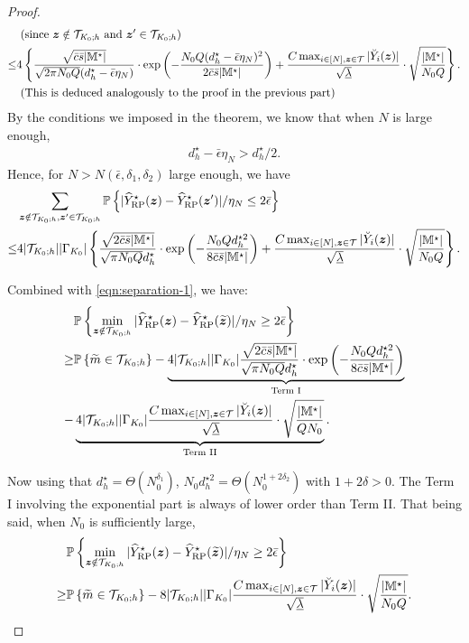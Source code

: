 \documentclass[12pt]{article}
\begin{document}
\begin{proof}
\begin{align*}
    & \text{ (since ${\boldsymbol{z}}\notin{\mathcal{T}}_{K_0;h}$ and ${\boldsymbol{z}}'\in{\mathcal{T}}_{K_0;h}$)}\\
    \le & 4\left\{ \frac{\sqrt{\bar{c}\bar{s}|{\mathbb{M}}^\star|}}{\sqrt{2\pi N_0Q }({d_h^\star - \bar{\epsilon}\eta_N})}\cdot \exp\left(-\frac{ N_0Q ({d_h^\star - \bar{\epsilon}\eta_N})^{  2}}{2\bar{c}\bar{s}|{\mathbb{M}}^\star|}\right)
    +  \frac{C \max_{i\in[N],{\boldsymbol{z}}\in{\mathcal{T}}}|\breve{Y}_i({\boldsymbol{z}})| }{\sqrt{\underline{\lambda}}}\cdot \sqrt{\frac{|{\mathbb{M}}^\star|}{N_0Q}}\right\}. \\
    & \text{ (This is deduced analogously to the proof in the previous part)}
\end{align*}
By the conditions we imposed in the theorem, we know that when $N$ is large enough,
\begin{align*}
    d_h^\star - \bar{\epsilon}\eta_N > d_h^\star/2.
\end{align*}
Hence, for $N>N(\bar{\epsilon},\delta_1,\delta_2)$ large enough, we have
\begin{align*}
    &\sum_{{\boldsymbol{z}}\notin {\mathcal{T}}_{K_0;h}, {\boldsymbol{z}}'\in{\mathcal{T}}_{K_0;h}}{\mathbb{P}}\left\{|{\widehat{Y}}^\star_{\operatorname{RP}}({\boldsymbol{z}}) - {\widehat{Y}}^\star_{\operatorname{RP}}({\boldsymbol{z}}')|/\eta_N \le 2\bar{\epsilon}\right\} \\
    \le & 4|{\mathcal{T}}_{K_0;h}| |\Gamma_{K_0}|\left\{ \frac{\sqrt{2\bar{c}\bar{s}|{\mathbb{M}}^\star|}}{\sqrt{\pi N_0Q }{d_h^\star}}\cdot \exp\left(-\frac{ N_0Q d_h^{\star 2}}{8\bar{c}\bar{s}|{\mathbb{M}}^\star|}\right)
    +  \frac{C \max_{i\in[N],{\boldsymbol{z}}\in{\mathcal{T}}}|\breve{Y}_i({\boldsymbol{z}})| }{\sqrt{\underline{\lambda}}}\cdot \sqrt{\frac{|{\mathbb{M}}^\star|}{N_0Q}}\right\}.
\end{align*}


Combined with \eqref{eqn:separation-1},  we have:
\begin{align}
    &{\mathbb{P}}\left\{\min_{{\boldsymbol{z}}\notin {\mathcal{T}}_{K_0;h}}|{\widehat{Y}}^\star_{\operatorname{RP}}({\boldsymbol{z}}) - {\widehat{Y}}^\star_{\operatorname{RP}}(\widetilde{{\boldsymbol{z}}})|/\eta_N \ge 2\bar{\epsilon}\right\} \notag\\
    \ge & {\mathbb{P}}\left\{\widetilde{m}\in {\mathcal{T}}_{K_0;h}\right\} -   \underbrace{4|{\mathcal{T}}_{K_0;h}| |\Gamma_{K_0}|  \frac{\sqrt{2\bar{c}\bar{s}|{\mathbb{M}}^\star|}}{\sqrt{\pi N_0Q }{d_h^\star}}\cdot \exp\left(-\frac{ N_0Q d_h^{\star 2}}{8\bar{c}\bar{s}|{\mathbb{M}}^\star|}\right)}_{\text{Term I}}\notag\\
    - &  \underbrace{4|{\mathcal{T}}_{K_0;h}| |\Gamma_{K_0}| \frac{C \max_{i\in[N],{\boldsymbol{z}}\in{\mathcal{T}}}|\breve{Y}_i({\boldsymbol{z}})| }{\sqrt{\underline{\lambda}}}\cdot \sqrt{\frac{|{\mathbb{M}}^\star|}{Q N_0}}}_{\text{Term II}}. \label{eqn:large-1}
\end{align}

Now using that $d_h^\star = \Theta(N_0^{\delta_1})$, $N_0d_h^{\star2} = \Theta(N_0^{1+2\delta_2})$ with $1+2\delta>0$.    The Term I involving the exponential part  is always of lower order than Term II. That being said, when $N_0$ is sufficiently large,
\begin{align*}
    &{\mathbb{P}}\left\{\min_{{\boldsymbol{z}}\notin {\mathcal{T}}_{K_0;h}}|{\widehat{Y}}^\star_{\operatorname{RP}}({\boldsymbol{z}}) - {\widehat{Y}}^\star_{\operatorname{RP}}(\widetilde{{\boldsymbol{z}}})|/\eta_N \ge 2\bar{\epsilon}\right\} \\
    \ge & {\mathbb{P}}\left\{\widetilde{m}\in {\mathcal{T}}_{K_0;h}\right\} - 8|{\mathcal{T}}_{K_0;h}| |\Gamma_{K_0}| \frac{C \max_{i\in[N],{\boldsymbol{z}}\in{\mathcal{T}}}|\breve{Y}_i({\boldsymbol{z}})| }{\sqrt{\underline{\lambda}}}\cdot \sqrt{\frac{|{\mathbb{M}}^\star|}{N_0Q}}.
\end{align*}


\end{proof}
\end{document}
